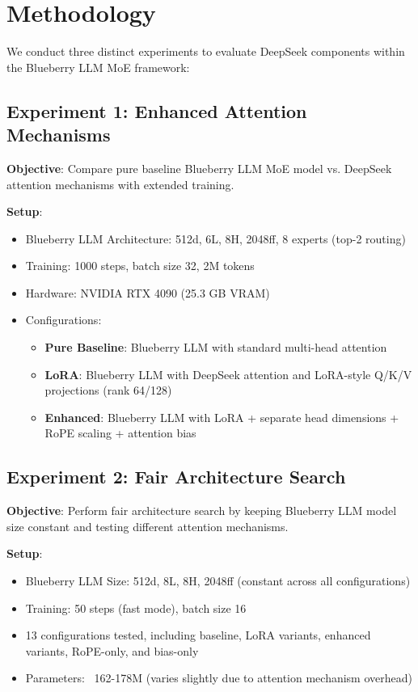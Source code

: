 \documentclass[11pt,a4paper]{article}
\begin{document}
\section{Methodology}

We conduct three distinct experiments to evaluate DeepSeek components within the Blueberry LLM MoE framework:

\subsection{Experiment 1: Enhanced Attention Mechanisms}

\textbf{Objective}: Compare pure baseline Blueberry LLM MoE model vs. DeepSeek attention mechanisms with extended training.

\textbf{Setup}:
\begin{itemize}
    \item Blueberry LLM Architecture: 512d, 6L, 8H, 2048ff, 8 experts (top-2 routing)
    \item Training: 1000 steps, batch size 32, 2M tokens
    \item Hardware: NVIDIA RTX 4090 (25.3 GB VRAM)
    \item Configurations:
    \begin{itemize}
        \item \textbf{Pure Baseline}: Blueberry LLM with standard multi-head attention
        \item \textbf{LoRA}: Blueberry LLM with DeepSeek attention and LoRA-style Q/K/V projections (rank 64/128)
        \item \textbf{Enhanced}: Blueberry LLM with LoRA + separate head dimensions + RoPE scaling + attention bias
    \end{itemize}
\end{itemize}

\subsection{Experiment 2: Fair Architecture Search}

\textbf{Objective}: Perform fair architecture search by keeping Blueberry LLM model size constant and testing different attention mechanisms.

\textbf{Setup}:
\begin{itemize}
    \item Blueberry LLM Size: 512d, 8L, 8H, 2048ff (constant across all configurations)
    \item Training: 50 steps (fast mode), batch size 16
    \item 13 configurations tested, including baseline, LoRA variants, enhanced variants, RoPE-only, and bias-only
    \item Parameters: ~162-178M (varies slightly due to attention mechanism overhead)
\end{itemize}
\end{document}
